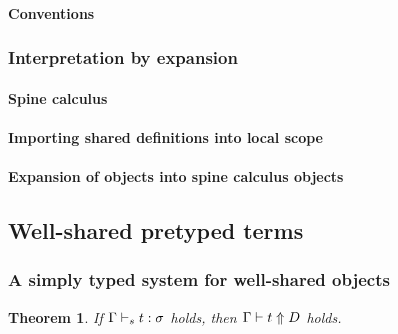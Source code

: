 \documentclass[9pt,authoryear]{sigplanconf}
\newtheorem{theorem}{Theorem}
\begin{document}
\paragraph{Conventions} 




\subsubsection{Interpretation by expansion}

\paragraph{Spine calculus}


\paragraph{Importing shared definitions into local scope}


\paragraph{Expansion of {\system} objects into spine calculus objects}



\subsection{Well-shared pretyped terms}

\subsubsection{A simply typed system for well-shared objects}








\begin{theorem}
If $\Gamma \vdash_{s} t : \sigma$ holds, then 
$\Gamma \vdash t \Uparrow D$ holds. 
\end{theorem}
\end{document}
